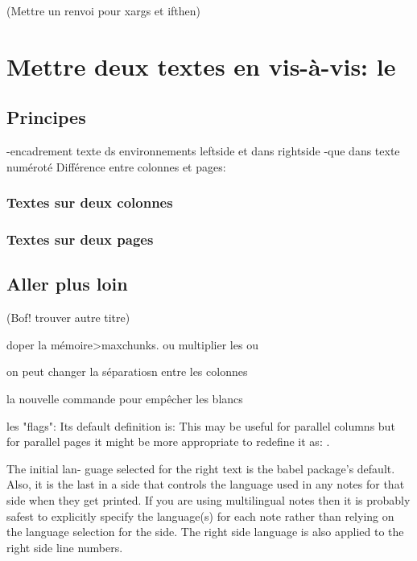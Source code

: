 (Mettre un renvoi pour xargs et ifthen)

 




\section{Mettre deux textes en vis-à-vis: le }

\subsection{Principes}

-encadrement texte ds environnements leftside et dans rightside
-que dans texte numéroté
Différence entre colonnes et pages: 
\subsubsection{Textes sur deux colonnes}
\subsubsection{Textes sur deux pages}
\subsection{Aller plus loin}
(Bof! trouver autre titre)

doper la mémoire>maxchunks. ou multiplier les  ou 

on peut changer la séparatiosn entre les colonnes

la nouvelle commande pour empêcher les blancs

les "flags": Its default definition is: \newcommand*{\Rlineflag}{R} This may be useful for parallel columns but for parallel pages it might be more appropriate to redefine it as:
\renewcommand*{\Rlineflag}{}.

The initial lan- guage selected for the right text is the babel package’s default. Also, it is the last \selectlanguage in a side that controls the language used in any notes for that
side when they get printed. If you are using multilingual notes then it is probably safest to explicitly specify the language(s) for each note rather than relying on the language selection for the side. The right side language is also applied to the right side line numbers.
